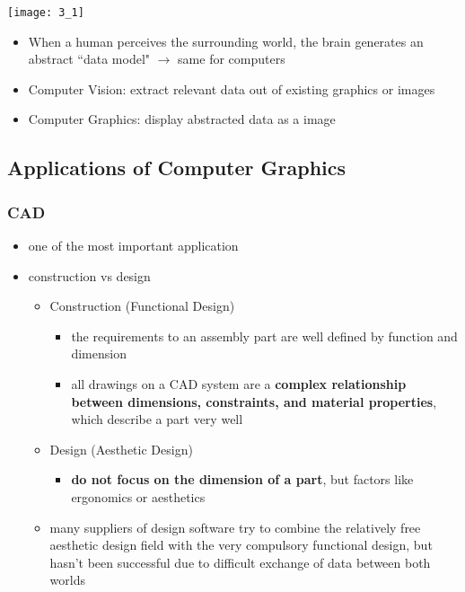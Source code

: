 \documentclass{standalone}
\begin{document}
\texttt{[image: 3\_1]}

\begin{itemize}
	\item When a human perceives the surrounding world, the brain generates an abstract ``data model" $\rightarrow$ same for computers
	\item Computer Vision: extract relevant data out of existing graphics or images
	\item Computer Graphics: display abstracted data as a image
\end{itemize}

\subsection{Applications of Computer Graphics}

\subsubsection{CAD}

\begin{itemize}
	\item one of the most important application 
	\item construction vs design
		\begin{itemize}
			\item Construction (Functional Design)
				\begin{itemize}
					\item the requirements to an assembly part are well defined by function and dimension
					\item all drawings on a CAD system are a \textbf{complex relationship between dimensions, constraints, and material properties}, which describe a part very well
				\end{itemize}
				\item Design (Aesthetic Design)
				\begin{itemize}
					\item \textbf{do not focus on the dimension of a part}, but factors like ergonomics or aesthetics
				\end{itemize}
			\item many suppliers of design software try to combine the relatively free aesthetic design field with the very compulsory functional design, but hasn't been successful due to difficult exchange of data between both worlds
		\end{itemize}
\end{itemize}
\end{document}
